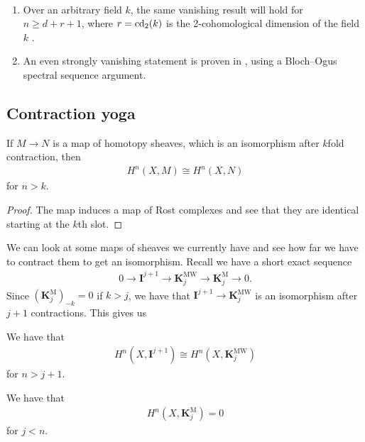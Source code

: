 \documentclass[11pt,openany]{book}
\providecommand{\KM}{\mathbf{K}^\mathrm{M}}
\providecommand{\KMW}{\mathbf{K}^\mathrm{MW}}
\begin{document}
\begin{remark} \,
\begin{enumerate}
    \item Over an arbitrary field $k$, the same vanishing result will hold for $n \ge d+r+1$, where $r = \mathrm{cd}_2(k)$ is the 2-cohomological dimension of the field $k$ \cite[5.1]{AF3}.
    \item An even strongly vanishing statement is proven in \cite[5.2]{AF3}, using a Bloch--Ogus spectral sequence argument.
\end{enumerate}
\end{remark}

\subsection{Contraction yoga}

\begin{proposition} If $M\to N$ is a map of homotopy sheaves, which is an isomorphism after $k$fold contraction, then
\begin{align*}
    H^n(X,M) \cong H^n(X,N)
\end{align*}
for $n >k$.
\end{proposition}
\begin{proof} The map induces a map of Rost complexes and see that they are identical starting at the $k$th slot.
\end{proof}
%
We can look at some maps of sheaves we currently have and see how far we have to contract them to get an isomorphism. Recall we have a short exact sequence
\begin{align*}
    0 \to \mathbf{I}^{j+1} \to \KMW_j \to \KM_j \to 0.
\end{align*}
Since $(\KM_j)_{-k} = 0$ if $k>j$, we have that $\mathbf{I}^{j+1} \to \KMW_j$ is an isomorphism after $j+1$ contractions. This gives us

\begin{proposition} We have that
\begin{align*}
    H^n(X, \mathbf{I}^{j+1}) \cong H^n(X, \KMW_j)
\end{align*}
for $n > j+1$.
\end{proposition}

\begin{proposition} We have that
\begin{align*}
    H^n(X, \KM_j) = 0
\end{align*}
for $j<n$.
\end{proposition}
\end{document}
